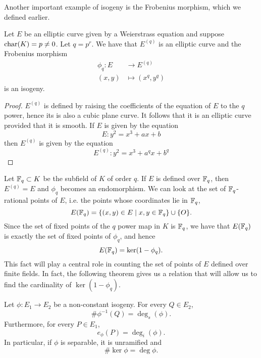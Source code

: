 Another important example of isogeny is the Frobenius morphism, which we defined
earlier.
\begin{proposition}
	Let $E$ be an elliptic curve given by a Weierstrass equation
	and suppose $\operatorname{char}(K) = p \neq 0$. Let
	$q = p^r$. We have that $E^{(q)}$ is an elliptic curve and
	the Frobenius morphism
	\begin{align*}
		\phi_q: E &\to E^{(q)}\\
		(x, y)&\mapsto (x^q, y^q)
	\end{align*}
	is an isogeny.
\end{proposition}
\begin{proof}
	$E^{(q)}$ is defined by raising the coefficients of the equation of $E$
	to the $q$ power, hence its is also a cubic plane curve.
	It follows that it is an elliptic curve provided that it is smooth.
	If $E$ is given by the equation
	\begin{equation*}
		E: y^2 = x^3 + ax + b
	\end{equation*}
	then $E^{(q)}$ is given by the equation
	\begin{equation*}
		E^{(q)}: y^2 = x^3 + a^qx + b^q
	\end{equation*}
\end{proof}

Let $\mathbb{F}_q \subset K$ be the subfield of $K$ of order $q$.
If $E$ is defined over $\mathbb{F}_q$,
then $E^{(q)} = E$ and $\phi_q$ becomes an endomorphism. 
We can look at the set of $\mathbb{F}_q$-rational points of $E$,
i.e. the points whose coordinates lie in $\mathbb{F}_q$,
\begin{equation*}
	E(\mathbb{F}_q) = \{(x, y) \in E\mid x,y \in \mathbb{F}_q\} \cup \{O\}.
\end{equation*}
Since the set of fixed points of the $q$ power map in $K$ is
$\mathbb{F}_q$, we have that $E(\mathbb{F}_q)$ is exactly the set of fixed points of $\phi_q$,
and hence
\begin{equation*}
	E(\mathbb{F}_q) = \ker(1 - \phi_q).
\end{equation*}
This fact will play a central role in counting
the set of points of $E$ defined
over finite fields. In fact, the following theorem gives us
a relation that will
allow us to find the cardinality of $\ker(1 - \phi_q)$.


\begin{theorem}
	\label{thm:preimage-card}
	Let $\phi: E_1 \to E_2$ be a non-constant isogeny.
	For every $Q\in E_2$,
	\begin{equation*}
		\#\phi^{-1}(Q) = \deg_s(\phi).
	\end{equation*}
	Furthermore, for every $P \in E_1$,
	\begin{equation*}
		e_\phi(P) = \deg_i(\phi).
	\end{equation*}
	In particular, if $\phi$ is separable, it is unramified and
	\begin{equation*}
		\# \ker\phi = \deg \phi.
	\end{equation*}
\end{theorem}

